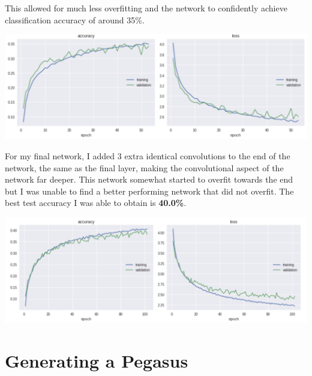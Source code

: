 \documentclass[11pt]{article}
\begin{document}
This allowed for much less overfitting and the network to confidently achieve classification accuracy of around 35\%.

     \begin{center} %
        \begin{minipage}{0.75\linewidth}
            \includegraphics[width=\linewidth]{accuracy7}
        \end{minipage}%
    \end{center}
    

For my final network, I added 3 extra identical convolutions to the end of the network, the same as the final layer, making the convolutional aspect of the network far deeper. This network somewhat started to overfit towards the end but I was unable to find a better performing network that did not overfit. The best test accuracy I was able to obtain is \textbf{40.0\%}.


     \begin{center} %
        \begin{minipage}{0.75\linewidth}
            \includegraphics[width=\linewidth]{accuracy8}
        \end{minipage}%
    \end{center}


\section{Generating a Pegasus}
\end{document}
